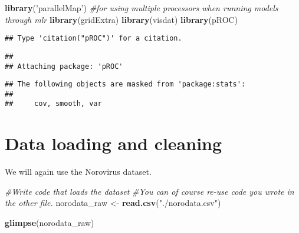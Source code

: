 \documentclass[]{article}
\newenvironment{Shaded}{\begin{snugshade}}{\end{snugshade}}
\newcommand{\CommentTok}[1]{\textcolor[rgb]{0.56,0.35,0.01}{\textit{#1}}}
\newcommand{\KeywordTok}[1]{\textcolor[rgb]{0.13,0.29,0.53}{\textbf{#1}}}
\newcommand{\NormalTok}[1]{#1}
\newcommand{\StringTok}[1]{\textcolor[rgb]{0.31,0.60,0.02}{#1}}
\begin{document}
\begin{Shaded}
\begin{Highlighting}[]
\KeywordTok{library}\NormalTok{(}\StringTok{'parallelMap'}\NormalTok{) }\CommentTok{#for using multiple processors when running models through mlr}
\KeywordTok{library}\NormalTok{(gridExtra)}
\KeywordTok{library}\NormalTok{(visdat)}
\KeywordTok{library}\NormalTok{(pROC)}
\end{Highlighting}
\end{Shaded}

\begin{verbatim}
## Type 'citation("pROC")' for a citation.
\end{verbatim}

\begin{verbatim}
## 
## Attaching package: 'pROC'
\end{verbatim}

\begin{verbatim}
## The following objects are masked from 'package:stats':
## 
##     cov, smooth, var
\end{verbatim}

\hypertarget{data-loading-and-cleaning}{%
\section{Data loading and cleaning}\label{data-loading-and-cleaning}}

We will again use the Norovirus dataset.

\begin{Shaded}
\begin{Highlighting}[]
\CommentTok{#Write code that loads the dataset }
\CommentTok{#You can of course re-use code you wrote in the other file.}
\NormalTok{norodata_raw <-}\StringTok{ }\KeywordTok{read.csv}\NormalTok{(}\StringTok{"./norodata.csv"}\NormalTok{)}

\KeywordTok{glimpse}\NormalTok{(norodata_raw)}
\end{Highlighting}
\end{Shaded}
\end{document}
